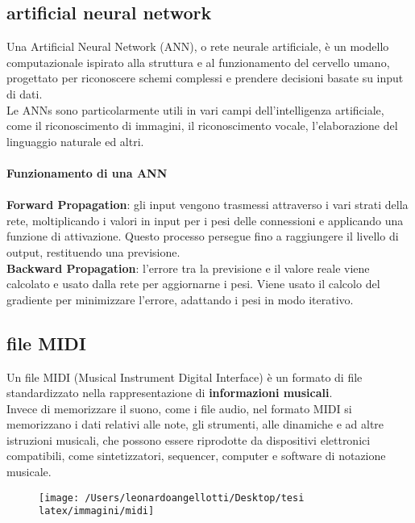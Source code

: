 \documentclass[a4paper,12pt]{report}
\begin{document}
\subsection{artificial neural network}

Una Artificial Neural Network (ANN), o rete neurale artificiale, è un modello computazionale ispirato alla struttura e al funzionamento del cervello umano, progettato per riconoscere schemi complessi e prendere decisioni basate su input di dati. \\
Le ANNs sono particolarmente utili in vari campi dell'intelligenza artificiale, come il riconoscimento di immagini, il riconoscimento vocale, l'elaborazione del linguaggio naturale ed altri. \\
\\
\textbf{Funzionamento di una ANN} \\
\\
\textbf{Forward Propagation}: gli input vengono trasmessi attraverso i vari strati della rete, moltiplicando i valori in input per i pesi delle connessioni e applicando una funzione di attivazione. Questo processo persegue fino a raggiungere il livello di output, restituendo una previsione.
\\
\textbf{Backward Propagation}: l'errore tra la previsione e il valore reale viene calcolato e usato dalla rete per aggiornarne i pesi. Viene usato il calcolo del gradiente per minimizzare l'errore, adattando i pesi in modo iterativo.

\subsection{file MIDI}

Un file MIDI (Musical Instrument Digital Interface) è un formato di file standardizzato nella rappresentazione di \textbf{informazioni musicali}. \\
Invece di memorizzare il suono, come i file audio, nel formato MIDI si memorizzano i dati relativi alle note, gli strumenti, alle dinamiche e ad altre istruzioni musicali, che possono essere riprodotte da dispositivi elettronici compatibili, come sintetizzatori, sequencer, computer e software di notazione musicale.

\begin{figure}[H]
    \centering
    \texttt{[image: /Users/leonardoangellotti/Desktop/tesi latex/immagini/midi]} 
    \label{fig:immagine6}
\end{figure}
\end{document}
